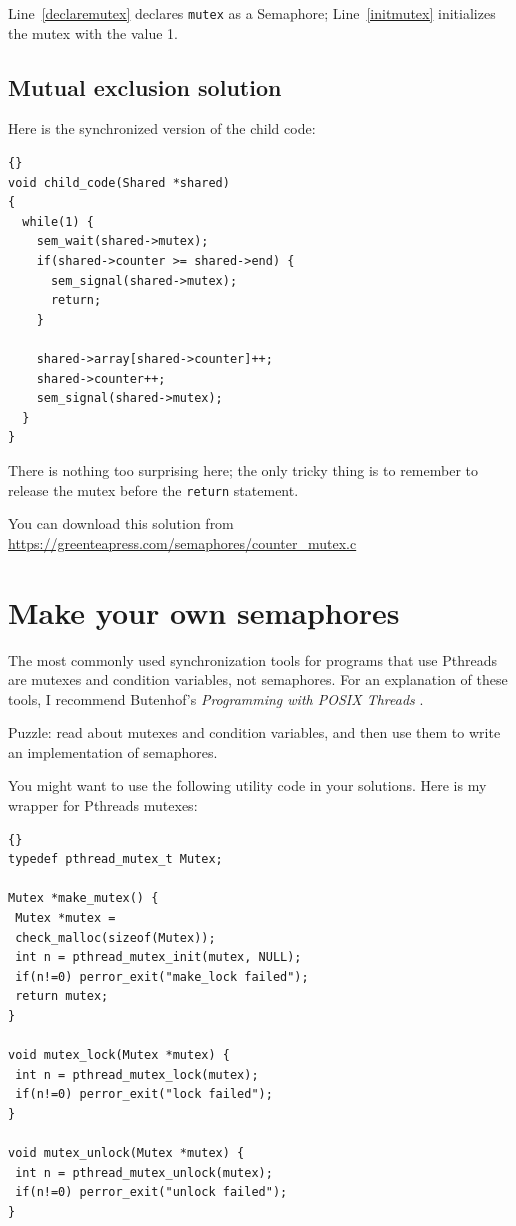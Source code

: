 \documentclass{book}
\begin{document}
Line~\ref{declaremutex} declares {\tt mutex} as a Semaphore;
Line~\ref{initmutex} initializes the mutex with the value 1.



\subsection{Mutual exclusion solution}

Here is the synchronized version of the child code:

\begin{lstlisting}[title={}]{}
void child_code(Shared *shared)
{
  while(1) {
    sem_wait(shared->mutex);
    if(shared->counter >= shared->end) {
      sem_signal(shared->mutex);
      return;
    }

    shared->array[shared->counter]++;
    shared->counter++;
    sem_signal(shared->mutex);
  }
}
\end{lstlisting}

There is nothing too surprising here; the only tricky thing
is to remember to release the mutex before the {\tt return}
statement.

You can download this solution from
\url{https://greenteapress.com/semaphores/counter_mutex.c}



\section{Make your own semaphores}
\label{makeyourown}

The most commonly used synchronization tools for programs that use
Pthreads are mutexes and condition variables, not semaphores.  For an
explanation of these tools, I recommend Butenhof's {\em Programming
with POSIX Threads} \cite{butenhof}.

Puzzle: read about mutexes and condition variables, and then
use them to write an implementation of semaphores.

You might want to use the following utility code in your solutions.
Here is my wrapper for Pthreads mutexes:

\begin{lstlisting}[title={}]{}
typedef pthread_mutex_t Mutex;

Mutex *make_mutex() {
 Mutex *mutex = 
 check_malloc(sizeof(Mutex));
 int n = pthread_mutex_init(mutex, NULL);
 if(n!=0) perror_exit("make_lock failed"); 
 return mutex;
}

void mutex_lock(Mutex *mutex) {
 int n = pthread_mutex_lock(mutex);
 if(n!=0) perror_exit("lock failed");
}

void mutex_unlock(Mutex *mutex) {
 int n = pthread_mutex_unlock(mutex);
 if(n!=0) perror_exit("unlock failed");
}
\end{lstlisting}
\end{document}
